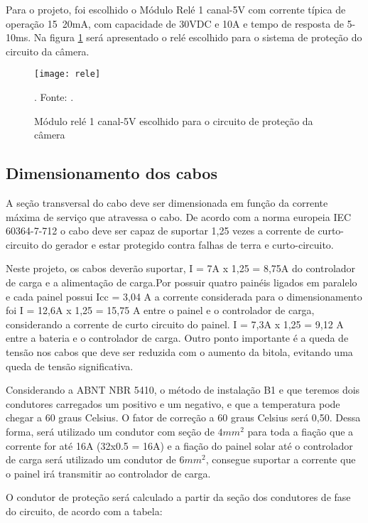 Para o projeto, foi escolhido o Módulo Relé 1 canal-5V com corrente típica de operação 15~20mA, com capacidade de 30VDC e 10A e tempo de resposta de 5-10ms. Na figura \ref{fig:rele} será apresentado o relé escolhido para o sistema de proteção do circuito da câmera.

\begin{figure}[H]
\centering
\texttt{[image: rele]}
    \caption{Módulo relé 1 canal-5V escolhido para o circuito de proteção da câmera}. Fonte: \cite{rele}.
\label{fig:rele}
\end{figure}
\FloatBarrier

\subsection{Dimensionamento dos cabos}

A seção transversal do cabo deve ser dimensionada em função da corrente máxima de serviço que atravessa o cabo. De acordo com a norma europeia IEC 60364-7-712 o cabo deve ser capaz de suportar 1,25 vezes a corrente de curto-circuito do gerador e estar protegido contra falhas de terra e curto-circuito. 

Neste projeto, os cabos deverão suportar, I = 7A x 1,25 = 8,75A do controlador de carga e a alimentação de carga.Por possuir quatro painéis ligados em paralelo e cada painel possui Icc = 3,04 A a corrente considerada para o dimensionamento foi I = 12,6A x 1,25 = 15,75 A entre o painel e o  controlador de carga, considerando a corrente de curto circuito do painel. I = 7,3A x 1,25 = 9,12 A entre a bateria e o controlador de carga. Outro ponto importante é a queda de tensão nos cabos que deve ser reduzida com o aumento da bitola, evitando uma queda de tensão significativa.

Considerando a ABNT NBR 5410, o método de instalação B1 e que teremos dois condutores carregados um positivo e um negativo, e que a temperatura pode chegar a 60 graus Celsius. O fator de correção a 60 graus Celsius será 0,50.  Dessa forma, será utilizado um condutor com seção de $4mm^2$ para toda a fiação que a corrente for até 16A (32x0.5 = 16A) e a fiação do painel solar até o controlador de carga será utilizado um condutor de $6mm^2$, consegue suportar a corrente que o painel irá transmitir ao controlador de carga. 

O condutor de proteção será calculado a partir da seção dos condutores de fase do circuito, de acordo com a tabela:

